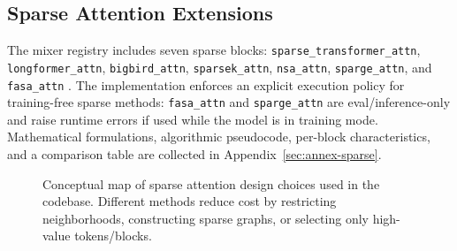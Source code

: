 \subsection{Sparse Attention Extensions}
The mixer registry includes seven sparse blocks: \texttt{sparse\_transformer\_attn}, \texttt{longformer\_attn}, \texttt{bigbird\_attn}, \texttt{sparsek\_attn}, \texttt{nsa\_attn}, \texttt{sparge\_attn}, and \texttt{fasa\_attn} \citep{child_sparse_transformer_2019,beltagy_longformer_2020,zaheer_bigbird_2020,lou_sparsek_2024,yuan_nsa_2025,zhang_spargeattn_2025,wang_fasa_2026}. The implementation enforces an explicit execution policy for training-free sparse methods: \texttt{fasa\_attn} and \texttt{sparge\_attn} are eval/inference-only and raise runtime errors if used while the model is in training mode. Mathematical formulations, algorithmic pseudocode, per-block characteristics, and a comparison table are collected in Appendix~\ref{sec:annex-sparse}.

\begin{figure}[t]
\centering
{}
\caption{Conceptual map of sparse attention design choices used in the codebase. Different methods reduce cost by restricting neighborhoods, constructing sparse graphs, or selecting only high-value tokens/blocks.}
\label{fig:sparse-map}
\end{figure}

